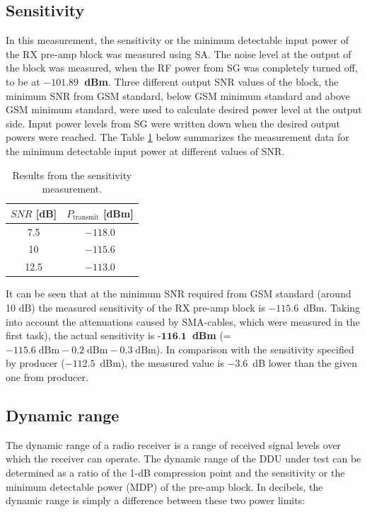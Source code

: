 \documentclass[a4paper, 12pt]{article}
\begin{document}
\subsection{Sensitivity}

In this measurement, the sensitivity or the minimum detectable input power of the RX pre-amp block was measured using SA. The noise level at the output of the block was measured, when the RF power from SG was completely turned off, to be at \textbf{$-101.89$~dBm}. Three different output SNR values of the block, the minimum SNR from GSM standard, below GSM minimum standard and above GSM minimum standard, were used to calculate desired power level at the output side. Input power levels from SG were written down when the desired output powers were reached. The Table \ref{t:sens} below summarizes the measurement data for the minimum detectable input power at different values of SNR.

\begin{table}[!h]
	\begin{center}
	\caption{Results from the sensitivity measurement.}
	\label{t:sens}
	\renewcommand*{\arraystretch}{1.2}
	\begin{tabular}{cc}
	$\mathit{SNR}$ [dB] 			& $P_\mathrm{transmit}$ [dBm]  \\
	\hline
	7.5								& $-118.0$ 	\\
	10								& $-115.6$ 	\\
	12.5							& $-113.0$ 	
	\end{tabular}
	\end{center}
	\vspace*{-12pt}
\end{table}

It can be seen that at the minimum SNR required from GSM standard (around 10 dB) the measured sensitivity of the RX pre-amp block is $-115.6$~dBm. Taking into account the attenuations caused by SMA-cables, which were measured in the first task), the actual sensitivity is \textbf{$\textbf{-116.1}$~dBm} (=$-115.6\mathrm{\;dBm} - 0.2\mathrm{\;dBm} - 0.3\mathrm{\;dBm}$). In comparison with the sensitivity specified by producer ($-112.5$~dBm), the measured value is $-3.6$~dB lower than the given one from producer.

\subsection{Dynamic range}

The dynamic range of a radio receiver is a range of received signal levels over which the receiver can operate. The dynamic range of the DDU under test can be determined as a ratio of the 1-dB compression point and the sensitivity or the minimum detectable power (MDP) of the pre-amp block. In decibels, the dynamic range is simply a difference between these two power limits:
\end{document}
